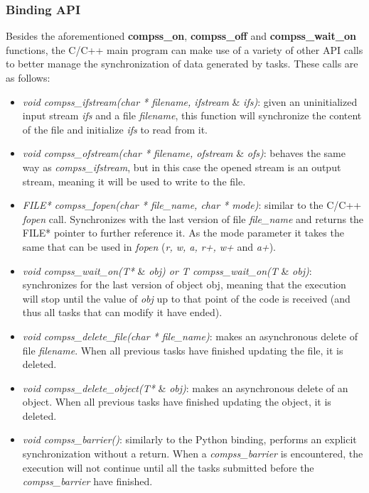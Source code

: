 \subsubsection{Binding API}
Besides the aforementioned {\bf compss\_on}, {\bf compss\_off} and {\bf compss\_wait\_on} functions, the C/C++ main program can make use of a variety of other API calls to better manage the synchronization of data generated by tasks. These calls are as follows:

\begin{itemize}
 \item {\it void compss\_ifstream(char * filename, ifstream }\& {\it ifs)}: given an uninitialized input stream {\it ifs} and a file {\it filename}, this function will synchronize the content of the file and initialize {\it ifs} to read from it.
 
 \item {\it void compss\_ofstream(char * filename, ofstream }\& {\it ofs)}: behaves the same way as {\it compss\_ifstream}, but in this case the opened stream is an output stream, meaning it will be used to write to the file.

 \item {\it FILE* compss\_fopen(char * file\_name, char * mode)}: similar to the C/C++ {\it fopen} call. Synchronizes with the last version of file {\it file\_name} and returns the FILE* pointer to further reference it. As the mode parameter it takes the same that can be used in {\it fopen} ({\it r, w, a, r+, w+} and {\it a+}). 
       
 \item {\it void compss\_wait\_on(T* }\& {\it obj) or T compss\_wait\_on(T }\& {\it obj)}: synchronizes for the last version of object obj, meaning that the execution will stop until the value of {\it obj} up to that point of the code is received (and thus all tasks that can modify it have ended).
 
 \item {\it void compss\_delete\_file(char * file\_name)}: makes an asynchronous delete of file {\it filename}. When all previous tasks have finished updating the file, it is deleted.
 
 \item {\it void compss\_delete\_object(T* }\& {\it obj)}: makes an asynchronous delete of an object. When all previous tasks have finished updating the object, it is deleted.
       
 \item {\it void compss\_barrier()}: similarly to the Python binding, performs an explicit synchronization without a return. When a {\it compss\_barrier} is encountered, the execution will not continue until all the tasks submitted before the {\it compss\_barrier} have finished.
\end{itemize}


